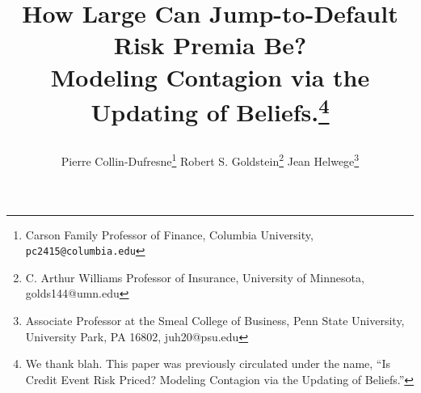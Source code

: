 \documentclass[titlepage,11pt]{article}
\begin{document}
\setlength{\baselineskip}{18pt}

\newcommand{\eproof}{{\hfill $\Box\,\,\,\,\,\,\,\,\,\,$}}
\newcommand{\supp}[1]{^{^{{#1}}}}
\newcommand{\M}{{\cal{M}}}
\newcommand{\Yb}{{\bf Y}}
\newcommand{\Q}{{\cal Q}}
\newcommand{\R}{{\cal R}}
\newcommand{\F}{{\cal F}}
\newcommand{\pr}{{\cal P}}
\newcommand{\Tb}{{\hat{T}}}
\newcommand{\ER}[1]{{\rm E^\R}\left[{#1}\right]}
\newcommand{\E}{{\rm E}}
\newcommand{\sub}[1]{_{_{{#1}}}}
\newcommand{\ind}[1]{{\bf 1}\sub{\left\{{#1}\right\}}}
\newcommand{\ignore}[1]{ }
\newcommand{\One}{{\bf 1}}
\newcommand{\hlf}{\frac{1}{2}}

\newcommand{\Ph}{p^H}
\newcommand{\Pl}{p^L}
\newcommand{\Qh}{q^H}
\newcommand{\lH}{\lambda\supp{H}}
\newcommand{\lL}{\lambda\supp{L}}
\newcommand{\lij}{\lambda\sub{ij}}
\newcommand{\aij}{\alpha\sub{ij}}
\newcommand{\pj}{p\supp{j}\!}
\newcommand{\pH}{p\supp{H}\!}
\newcommand{\tm}{t^{-}}
\newcommand{\qj}{q\supp{j}\!}
\newcommand{\bx}{\overline{\xi}}

\newcommand{\C}{{\widehat{C}}}
\newcommand{\kr}{\kappa\sub{r}}
\newcommand{\tr}{\theta\sub{r}}
\newcommand{\sr}{\sigma\sub{r}}
\newcommand{\kg}{\kappa\sub{g}}
\newcommand{\tg}{\theta\sub{g}}
\newcommand{\sg}{\sigma\sub{g}}
\newcommand{\ky}{\kappa\sub{y}}
\newcommand{\ty}{\theta\sub{y}}
\newcommand{\sy}{\sigma\sub{y}}
\newcommand{\sry}{\sigma\sub{ry}}
\newcommand{\s}{\widehat s}
\newcommand{\hten}{$\hspace*{10mm}$}
\newcommand{\ti}{\tau\sub{i}}

\newcommand{\la}{\lambda\sub{1}}
\newcommand{\lb}{\lambda\sub{2}}
\newcommand{\lc}{\lambda\sub{3}}
\newcommand{\ga}{\gamma\sub{1}}
\newcommand{\gb}{\gamma\sub{2}}

\newcommand{\sigc}{\sigma\sub{c}}
\newcommand{\vh}{\vspace*{1cm}}

\title{{\bf How Large Can Jump-to-Default Risk Premia Be?\\
Modeling Contagion via the Updating of Beliefs.}\thanks{We
thank blah. This paper was previously circulated
under the name, ``Is Credit Event Risk Priced? Modeling Contagion
via the Updating of Beliefs.''} \vskip 20pt
%
\author{Pierre Collin-Dufresne\thanks{Carson Family Professor of Finance,
Columbia University, {\tt pc2415@columbia.edu}}
%
\hspace*{10mm}  Robert S. Goldstein\thanks{C. Arthur Williams Professor of
Insurance, University of Minnesota, golds144@umn.edu}
%
\hspace*{10mm}  Jean Helwege\thanks{Associate Professor at the Smeal
College of Business, Penn State University, University Park, PA 16802,
juh20@psu.edu}
%
}}
\end{document}
